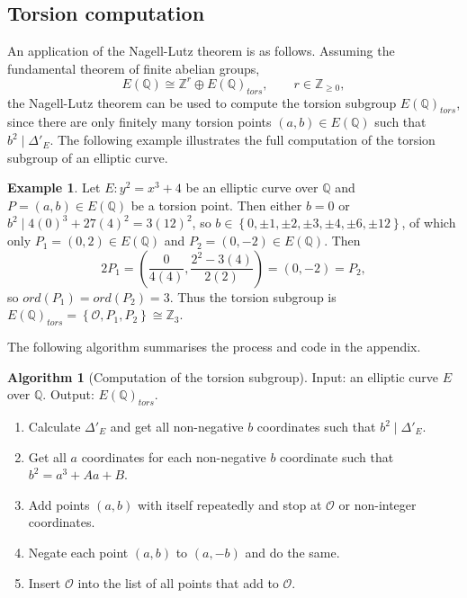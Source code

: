 \documentclass{article}
\newcommand{\Z}{\mathbb{Z}}
\newcommand{\Q}{\mathbb{Q}}
\newcommand{\rb}[1]{\left( #1 \right)}
\newcommand{\cb}[1]{\left\{ #1 \right\}}
\theoremstyle{definition}
\newtheorem*{example}{Example}
\newtheorem{algorithm}[proposition]{Algorithm}
\begin{document}
\subsection{Torsion computation}

An application of the Nagell-Lutz theorem is as follows. Assuming the fundamental theorem of finite abelian groups,
$$ E\rb{\Q} \cong \Z^r \oplus E\rb{\Q}_{tors}, \qquad r \in \Z_{\ge 0}, $$
the Nagell-Lutz theorem can be used to compute the torsion subgroup $ E\rb{\Q}_{tors} $, since there are only finitely many torsion points $ \rb{a, b} \in E\rb{\Q} $ such that $ b^2 \mid \Delta'_E $. The following example illustrates the full computation of the torsion subgroup of an elliptic curve.

\begin{example}
Let $ E : y^2 = x^3 + 4 $ be an elliptic curve over $ \Q $ and $ P = \rb{a, b} \in E\rb{\Q} $ be a torsion point. Then either $ b = 0 $ or $ b^2 \mid 4\rb{0}^3 + 27\rb{4}^2 = 3\rb{12}^2 $, so $ b \in \cb{0, \pm 1, \pm 2, \pm 3, \pm 4, \pm 6, \pm 12} $, of which only $ P_1 = \rb{0, 2} \in E\rb{\Q} $ and $ P_2 = \rb{0, -2} \in E\rb{\Q} $. Then
$$ 2P_1 = \rb{\dfrac{0}{4\rb{4}}, \dfrac{2^2 - 3\rb{4}}{2\rb{2}}} = \rb{0, -2} = P_2, $$
so $ ord\rb{P_1} = ord\rb{P_2} = 3 $. Thus the torsion subgroup is $ E\rb{\Q}_{tors} = \cb{\mathcal{O}, P_1, P_2} \cong \Z_3 $.
\end{example}

The following algorithm summarises the process and code in the appendix.

\begin{algorithm}[Computation of the torsion subgroup]
Input: an elliptic curve $ E $ over $ \Q $. Output: $ E\rb{\Q}_{tors} $.
\begin{enumerate}
\item Calculate $ \Delta'_E $ and get all non-negative $ b $ coordinates such that $ b^2 \mid \Delta'_E $.
\item Get all $ a $ coordinates for each non-negative $ b $ coordinate such that $ b^2 = a^3 + Aa + B $.
\item Add points $ \rb{a, b} $ with itself repeatedly and stop at $ \mathcal{O} $ or non-integer coordinates.
\item Negate each point $ \rb{a, b} $ to $ \rb{a, -b} $ and do the same.
\item Insert $ \mathcal{O} $ into the list of all points that add to $ \mathcal{O} $.
\end{enumerate}
\end{algorithm}
\end{document}
